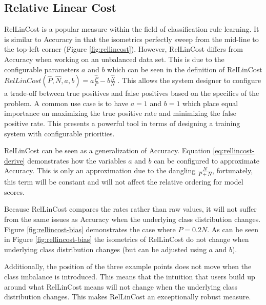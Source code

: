 \FloatBarrier
\subsection{Relative Linear Cost}

RelLinCost is a popular measure \cite{furnkranz2012foundations} within the field of classification rule learning. It is similar to Accuracy in that the isometrics perfectly sweep from the mid-line to the top-left corner (Figure \ref{fig:rellincost}). However, RelLinCost differs from Accuracy when working on an unbalanced data set. 
This is due to the configurable parameters $a$ and $b$ which can be seen in the definition of RelLinCost
$RelLinCost(\hat P, \hat N, a, b) = a  \frac{\hat P}{P} - b \frac{\hat N}{N}$
. This allows the system designer to configure a trade-off between true positives and false positives based on the specifics of the problem. A common use case is to have $a=1$ and $b=1$ which place equal importance on maximizing the true positive rate and minimizing the false positive rate. This presents a powerful tool in terms of designing a training system with configurable priorities.

RelLinCost can be seen as a generalization of Accuracy. Equation \ref{eq:rellincost-derive} demonstrates how the variables $a$ and $b$ can be configured to approximate Accuracy. This is only an approximation due to the dangling $\frac{N}{P+N}$, fortunately, this term will be constant and will not affect the relative ordering for model scores.

Because RelLinCost compares the rates rather than raw values, it will not suffer from the same issues as Accuracy when the underlying class distribution changes. Figure \ref{fig:rellincost-bias} demonstrates the case where $P = 0.2 N$. As can be seen in Figure \ref{fig:rellincost-bias} the isometrics of RelLinCost do not change when underlying class distribution changes (but can be adjusted using $a$ and $b$).

Additionally, the position of the three example points does not move when the class imbalance is introduced. This means that the intuition that users build up around what RelLinCost means will not change when the underlying class distribution changes. This makes RelLinCost an exceptionally robust measure.

